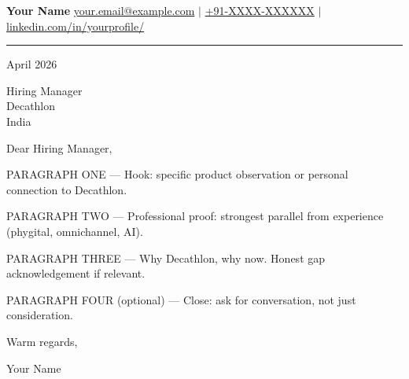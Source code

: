 \documentclass[letterpaper,12pt]{article}
\begin{document}
\textbf{\Large Your Name} \hfill
\href{mailto:your.email@example.com}{your.email@example.com}
$\vert$ \href{tel:+91-XXXX-XXXXXX}{+91-XXXX-XXXXXX}
$\vert$ \href{https://linkedin.com/in/yourprofile/}{linkedin.com/in/yourprofile/}

\vspace{4pt}
\rule{\textwidth}{0.4pt}
\vspace{2pt}

April 2026

Hiring Manager \\
Decathlon \\
India

Dear Hiring Manager,

PARAGRAPH ONE — Hook: specific product observation or personal connection to Decathlon.

PARAGRAPH TWO — Professional proof: strongest parallel from experience (phygital, omnichannel, AI).

PARAGRAPH THREE — Why Decathlon, why now. Honest gap acknowledgement if relevant.

PARAGRAPH FOUR (optional) — Close: ask for conversation, not just consideration.

Warm regards,

\vspace{24pt}
Your Name
\end{document}
